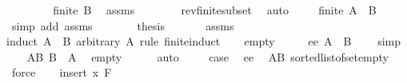 \begin{isabellebody}
\isadelimproof
%
\endisadelimproof
%
\isatagproof
{}\isamarkupfalse%
\ {\isacharminus}{\kern0pt}\ \isanewline
\ \ \ \ \isamarkupfalse%
\ {\isachardoublequoteopen}finite\ B{\isachardoublequoteclose}\ \isamarkupfalse%
\ assms\isanewline
\ \ \ \ \ \ \isamarkupfalse%
\ rev{\isacharunderscore}{\kern0pt}finite{\isacharunderscore}{\kern0pt}subset\ \isamarkupfalse%
\ auto\ \isanewline
\ \ \isamarkupfalse%
\ {\isachardoublequoteopen}finite\ {\isacharparenleft}{\kern0pt}A\ {\isacharminus}{\kern0pt}\ B{\isacharparenright}{\kern0pt}{\isachardoublequoteclose}\isanewline
\ \ \ \ \isamarkupfalse%
\ {\isacharparenleft}{\kern0pt}simp\ add{\isacharcolon}{\kern0pt}\ assms{\isacharparenleft}{\kern0pt}{}{\isacharparenright}{\kern0pt}{\isacharparenright}{\kern0pt}\ \ \isanewline
\ \ \isamarkupfalse%
\ \isamarkupfalse%
\ {\isacharquery}{\kern0pt}thesis\ \isanewline
\ \ \ \ \isamarkupfalse%
\ assms\isanewline
{}\isamarkupfalse%
{\isacharparenleft}{\kern0pt}induct\ {\isachardoublequoteopen}A\ {\isacharminus}{\kern0pt}\ B{\isachardoublequoteclose}\ arbitrary{\isacharcolon}{\kern0pt}\ A\ rule{\isacharcolon}{\kern0pt}\ finite{\isacharunderscore}{\kern0pt}induct{\isacharparenright}{\kern0pt}\isanewline
\ \ \isamarkupfalse%
\ empty\isanewline
\ \ \isamarkupfalse%
\ \isamarkupfalse%
\ ee{\isacharcolon}{\kern0pt}\ {\isachardoublequoteopen}A\ {\isacharminus}{\kern0pt}\ B\ {\isacharequal}{\kern0pt}\ {\isacharbraceleft}{\kern0pt}{\isacharbraceright}{\kern0pt}{\isachardoublequoteclose}\ \isamarkupfalse%
\ simp\isanewline
\ \ \isamarkupfalse%
\ AB{\isacharcolon}{\kern0pt}\ {\isachardoublequoteopen}B\ {\isacharequal}{\kern0pt}\ A{\isachardoublequoteclose}\ \isamarkupfalse%
\ empty\isanewline
\ \ \ \ \isamarkupfalse%
\ auto\ \isanewline
\ \ \isamarkupfalse%
\ {\isacharquery}{\kern0pt}case\ \isamarkupfalse%
\ ee\ \isamarkupfalse%
\ AB\ sorted{\isacharunderscore}{\kern0pt}list{\isacharunderscore}{\kern0pt}of{\isacharunderscore}{\kern0pt}set{\isacharunderscore}{\kern0pt}empty\ \isamarkupfalse%
\ force\isanewline
{}\isamarkupfalse%
\isanewline
\ \ \isamarkupfalse%
\ {\isacharparenleft}{\kern0pt}insert\ x\ F{\isacharparenright}{\kern0pt}\isanewline
\ \ \isamarkupfalse%

\end{isabellebody}
